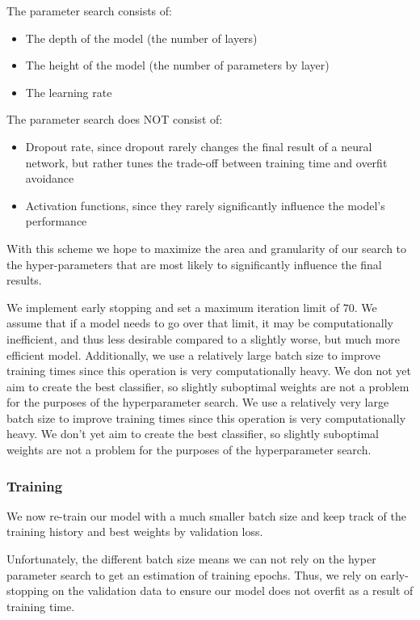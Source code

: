 \documentclass[11pt, a4paper]{article}
\begin{document}
	The parameter search consists of:
	\begin{itemize}
		\item The depth of the model (the number of layers)
		\item The height of the model (the number of parameters by layer) 
		\item The learning rate
	\end{itemize}

	
	The parameter search does NOT consist of:
	\begin{itemize}
		\item Dropout rate, since dropout rarely changes the final result of a neural network, but rather tunes the trade-off between training time and overfit avoidance
		\item Activation functions, since they rarely significantly influence the model's performance
	\end{itemize}
	
	With this scheme we hope to maximize the area and granularity of our search to the hyper-parameters that are most likely to significantly influence the final results.
	
	We implement early stopping and set a maximum iteration limit of $70$. We assume that if a model needs to go over that limit, it may be computationally inefficient, and thus less desirable compared to a slightly worse, but much more efficient model. Additionally, we use a relatively large batch size to improve training times since this operation is very computationally heavy. We don not yet aim to create the best classifier, so slightly suboptimal weights are not a problem for the purposes of the hyperparameter search.
	We use a relatively very large batch size to improve training times since this operation is very computationally heavy. We don't yet aim to create the best classifier, so slightly suboptimal weights are not a problem for the purposes of the hyperparameter search.
	
	\subsubsection{Training}
		
	We now re-train our model with a much smaller batch size and keep track of the training history and best weights by validation loss. 
	
	Unfortunately, the different batch size means we can not rely on the hyper parameter search to get an estimation of training epochs. Thus, we rely on early-stopping on the validation data to ensure our model does not overfit as a result of training time. 
	
\end{document}
